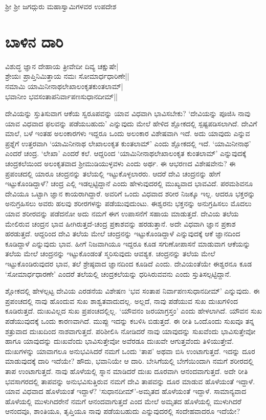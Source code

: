 ಶ್ರೀ ಶ್ರೀ ಜಗದ್ಗುರು ಮಹಾಸ್ವಾಮಿಗಳವರ ಉಪದೇಶ


\chapter{ಬಾಳಿನ ದಾರಿ}\label{chap1}


\begin{shloka}
ವಿಶುದ್ಧ ಜ್ಞಾನ ದೇಹಾಯ ತ್ರೀವೇದೀ ದಿವ್ಯ ಚಕ್ಷುಷೇ|\\
ಶ್ರೇಯಃ ಪ್ರಾಪ್ತಿನಿಮಿತ್ತಾಯ ನಮಃ ಸೋಮಾರ್ಧಧಾರಿಣೇ||\\
ನಮಾಮಿ ಯಾಮಿನೀನಾಥಲೇಖಾಲಂಕೃತಕುಂತಲಾಮ್|\\
ಭವಾನೀಂ ಭವಸಂತಾಪನಿರ್ವಾಪಣಸುಧಾನದೀಮ್||
\end{shloka}


ದೇವಿಯನ್ನು ಸ್ತುತಿಸುವಾಗ ಆಕೆಯ ಸ್ವರೂಪವನ್ನು ಯಾವ ವಿಧವಾಗಿ ಭಾವಿಸಬೇಕು? `ದೇವಿಯನ್ನು ಪೂಜಿಸಿ ನಾವು ಯಾವ 
ವಿಧವಾದ ಫಲವನ್ನು ಪಡೆಯಬಹುದು' ಎನ್ನುವುದು ಮೇಲೆ ಹೇಳಿದ ಶ್ಲೋಕದಲ್ಲಿ ಸ್ಪಷ್ಟಪಡಿಸಲಾಗಿದೆ. ದೇವಿಗೆ 
ಮಾಲೆ, ಬಳೆ ಇಂತಹ ಅಲಂಕಾರಗಳು ಇದ್ದರೂ ಒಂದು ಅಲಂಕಾರ ವಿಶೇಷವಾಗಿ ಇದೆ. ಅದು ಯಾವುದು ಎನ್ನುವ ಪ್ರಶ್ನೆಗೆ 
ಉತ್ತರವಾಗಿ `ಯಾಮಿನೀನಾಥ ಲೇಖಾಲಂಕೃತ ಕುಂತಲಾಮ್' ಎಂದು ಶ್ಲೋಕದಲ್ಲಿ ಇದೆ. `ಯಾಮಿನೀನಾಥ' 
ಎಂದರೆ ಚಂದ್ರ. `ಲೇಖಾ' ಎಂದರೆ ಕಲೆ. ಆದ್ದರಿಂದ `ಯಾಮಿನೀನಾಥಲೇಖಾಲಂಕೃತ ಕುಂತಲಾಮ್' ಎನ್ನುವುದಕ್ಕೆ 
ಚಂದ್ರಕಲೆಯಿಂದ ಅಲಂಕೃತವಾದ ಶ್ರೀಮುಡಿಯುಳ್ಳವಳು ಎಂದು ಅರ್ಥ. ಈ ಆಭರಣದ ವಿಶೇಷವೇನು? ಈ 
ಪ್ರಪಂಚದಲ್ಲಿ ಯಾರೂ ಚಂದ್ರನನ್ನು ತಲೆಯಲ್ಲಿ ಇಟ್ಟುಕೊಳ್ಳಲಾರರು. ಆದರೆ ದೇವಿ ಚಂದ್ರನನ್ನು ಹೇಗೆ ಇಟ್ಟುಕೊಂಡಿದ್ದಾಳೆ? ಚಂದ್ರ 
ಎಲ್ಲಿ ಇಡಲ್ಪಟ್ಟಿದ್ದಾನೆ ಎಂದು ಹೇಳುವುದರಲ್ಲಿ ಮುಖ್ಯವಾದ ಭಾವವಿದೆ. ಪರಮಶಿವನೂ ದೇವಿಯೂ ಒಟ್ಟಾಗಿ 
ಜ್ಞಾನ ಕಾಯರಾಗಿದ್ದಾರೆ. ಅವರಿಗೆ ಒಂದು ವಿಧವಾದ ಶರೀರ ನಿಜಕ್ಕೂ ಇಲ್ಲ. ಆದರೂ ಭಕ್ತರನ್ನು ಅನುಗ್ರಹಿಸಲು 
ಅವರು ಹಲವು ಶರೀರಗಳನ್ನು ಪಡೆಯುವುದುಂಟು. ಈಶ್ವರನು ಭಕ್ತನನ್ನು ಅನುಗ್ರಹಿಸಲು ಮೊದಲು ಯಾವ ಶರೀರವನ್ನು 
ಪಡೆದನೋ ಅದು ನಮಗೆ ಈಗ ಉಪಾಸನೆಗೆ ಸಹಾಯ ಮಾಡುತ್ತದೆ. ದೇವಿಯ ತಲೆಯ ಮೇಲಿರುವ ಚಂದ್ರನ 
ಭಾವ ಹೀಗಿರುತ್ತದೆ-ಚಂದ್ರ ಪ್ರಕಾಶವನ್ನು ಹರಡುತ್ತಾನೆ. ಅದೇ ವಿಧವಾಗಿ ಜ್ಞಾನ ಪ್ರಕಾಶ ಹರಡುತ್ತದೆ. ಆದ್ದರಿಂದ ದೇವಿ 
ತಲೆಯ ಮೇಲೆ ಚಂದ್ರನನ್ನು ಇಟ್ಟುಕೊಂಡಿದ್ದಾಳೆ ಎನ್ನುವುದಕ್ಕೆ ಆಕೆ ಜ್ಞಾನದಿಂದ ಕೂಡಿದ್ದಾಳೆ ಎನ್ನುವುದು ಭಾವ. ಹೀಗೆ 
ನಿಜವಾಗಿಯೂ ಇದ್ದರೂ ಕೂಡ ಸಗುಣೋಪಾಸನೆ ಮಾಡುವಾಗ ಆಕೆಯನ್ನು ತಲೆಯ ಮೇಲೆ ಚಂದ್ರನನ್ನು ಇಟ್ಟುಕೊಂಡಂತೆ 
ಸ್ಮರಿಸುವುದು ಆವಶ್ಯಕ. ಚಂದ್ರನನ್ನು ತಲೆಯ ಮೇಲೆ ಇಟ್ಟುಕೊಂಡಿರುವುದರ ಭಾವ, ತಲೆ ಶ್ರೇಷ್ಠವಾದ ಜ್ಞಾನದಿಂದ 
ಕೂಡಿದೆ ಎಂದು. ದೇವಿಯಂತೆಯೇ ಈಶ್ವರನೂ ಕೂಡ `ಸೋಮಾರ್ಧಧಾರಣೇ' ಎಂದರೆ ತಲೆಯಲ್ಲಿ ಚಂದ್ರಕಲೆಯನ್ನು ಧರಿಸಿರುವವನು ಎಂದು ಸ್ತುತಿಸಲ್ಪಟ್ಟಿದ್ದಾನೆ.

ಶ್ಲೋಕದಲ್ಲಿ ಹೇಳಲ್ಪಟ್ಟ ದೇವಿಯ ಎರಡನೆಯ ವಿಶೇಷಣ `ಭವ ಸಂತಾಪ ನಿರ್ವಾಪಣಸುಧಾನದೀಮ್' ಎನ್ನುವುದು. ಈ ಪ್ರಪಂಚದಲ್ಲಿ 
ನಾವು ಹೊಂದುವ ಸುಖ ಶಾಶ್ವತವಾದುದಲ್ಲ. ಅಲ್ಲದೆ, ನಾವು ಪಡೆಯುವ ಸುಖ ದುಃಖಗಳಿಂದ ಕೂಡಿರುತ್ತದೆ. ದುಃಖವಿಲ್ಲದ 
ಸುಖ ಪ್ರಪಂಚದಲ್ಲಿಲ್ಲ. `ಯೌವನಂ ಜರಯಾಗ್ರಸ್ತಂ' ಎಂದು ಹೇಳಲಾಗಿದೆ. ಯೌವನ ಸುಖ ಪಡೆಯುವುದಕ್ಕೆ ಒಂದು 
ಕಾರಣವಾಗಿದೆ. ಮುಪ್ಪು ಇದನ್ನು ಕಬಳಿಸಿ ಬಿಡುತ್ತದೆ. ಈ ರೀತಿ ಒಂದೊಂದು ಸುಖವೂ ತನ್ನ ಶತ್ರುವಾದ ದುಃಖದಿಂದ 
ನಾಶವಾಗುತ್ತದೆ. ಪರಿಶೀಲಿಸಿ ನೋಡಿದರೆ ನಾವು ಯಾವುದನ್ನು ಸುಖವೆಂದು ಭಾವಿಸುತ್ತೇವೋ 
ಹಾಗೂ ಯಾವುದನ್ನು ದುಃಖವೆಂದು ಭಾವಿಸುತ್ತೇವೋ ಅವೆರಡೂ ದುಃಖವೇ ಆಗುತ್ತವೆಂದು ತಿಳಿಯುತ್ತೇವೆ. ದುಃಖಗಳನ್ನು 
ಯಾವಾಗಲೂ ಅನುಭವಿಸಿದರೆ ನಮಗೆ ಒಂದು `ತಾಪ' ಅಥವಾ ಬಿಸಿ ಉಂಟಾಗುತ್ತದೆ. ಇದನ್ನು ದೂರ 
ಮಾಡುವುದಕ್ಕೆ ದಾರಿ ಇದೆಯೇ? ಹೌದು, ಭವಾನಿಯೇ ಆ ದಾರಿ. ಬೇಸಿಗೆಯಲ್ಲಿ ಬೇಗೆಯಿಂದಾಗಿ 
ನಮಗೆ ಶರೀರದಲ್ಲಿ ತಾಪ ಉಂಟಾಗುತ್ತದೆ. ನಾವು ಹೊಳೆಯಲ್ಲಿ ಸ್ನಾನ ಮಾಡಿದರೆ ದುಃಖ ದೂರವಾಗಿ 
ಆನಂದವಾಗುತ್ತದೆ. ಅದೇ ರೀತಿ ಭವಸಾಗರದಲ್ಲಿ ತಾಪವನ್ನು ಅನುಭವಿಸುತ್ತಿರುವ ನಮಗೆ ದೇವಿ 
ತಾಪವನ್ನು ದೂರ ಮಾಡುವ ಹೊಳೆಯಂತೆ ಇದ್ದಾಳೆ. ಯಾವ ವಿಧವಾದ ಹೊಳೆಯಂತೆ ಇದ್ದಾಳೆ? 
`ಸುಧಾನದೀಮ್'-ಅಮೃತದ ಹೊಳೆಯಂತೆ ಇದ್ದಾಳೆ. ಸಾಮಾನ್ಯವಾದ ಹೊಳೆಯಲ್ಲಿ ಮುಳುಗಿದರೇನೆ 
ನಮಗೆ ಆನಂದವಾಗುತ್ತದೆ ಎಂದ ಮೇಲೆ ಅಮೃತದ ಹೊಳೆಯಲ್ಲಿ ಮುಳುಗಿದರೆ ಆನಂದವೂ, ಶಾಂತಿಯೂ, 
ತೃಪ್ತಿಯೂ ನಾವು ಪಡೆಯಬಹುದು ಎನ್ನುವುದರಲ್ಲಿ ಸಂದೇಹವಾದರೂ ಇದೆಯೇ?

